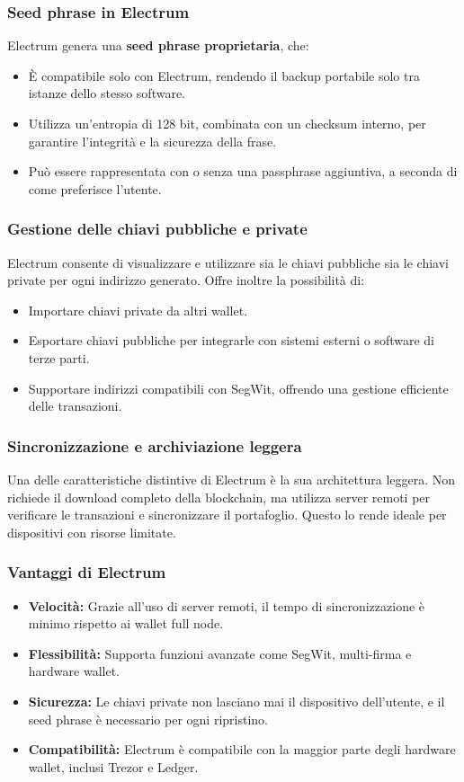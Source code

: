 \documentclass{article}
\begin{document}
\subsubsection{Seed phrase in Electrum}
Electrum genera una \textbf{seed phrase proprietaria}, che:
\begin{itemize}
    \item È compatibile solo con Electrum, rendendo il backup portabile solo tra istanze dello stesso software.
    \item Utilizza un'entropia di 128 bit, combinata con un checksum interno, per garantire l'integrità e la sicurezza della frase.
    \item Può essere rappresentata con o senza una passphrase aggiuntiva, a seconda di come preferisce l'utente.
\end{itemize}

\subsubsection{Gestione delle chiavi pubbliche e private}
Electrum consente di visualizzare e utilizzare sia le chiavi pubbliche sia le chiavi private per ogni indirizzo generato. Offre inoltre la possibilità di:
\begin{itemize}
    \item Importare chiavi private da altri wallet.
    \item Esportare chiavi pubbliche per integrarle con sistemi esterni o software di terze parti.
    \item Supportare indirizzi compatibili con SegWit, offrendo una gestione efficiente delle transazioni.
\end{itemize}

\subsubsection{Sincronizzazione e archiviazione leggera}
Una delle caratteristiche distintive di Electrum è la sua architettura leggera. Non richiede il download completo della blockchain, ma utilizza server remoti per verificare le transazioni e sincronizzare il portafoglio. Questo lo rende ideale per dispositivi con risorse limitate.

\subsubsection{Vantaggi di Electrum}
\begin{itemize}
    \item \textbf{Velocità:} Grazie all'uso di server remoti, il tempo di sincronizzazione è minimo rispetto ai wallet full node.
    \item \textbf{Flessibilità:} Supporta funzioni avanzate come SegWit, multi-firma e hardware wallet.
    \item \textbf{Sicurezza:} Le chiavi private non lasciano mai il dispositivo dell'utente, e il seed phrase è necessario per ogni ripristino.
    \item \textbf{Compatibilità:} Electrum è compatibile con la maggior parte degli hardware wallet, inclusi Trezor e Ledger.
\end{itemize}
\end{document}
